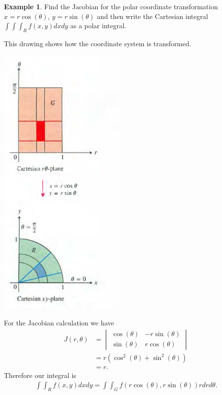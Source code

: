 \documentclass[12pt, letter]{article}
\theoremstyle{plain}
\numberwithin{theorem}{section}
\theoremstyle{definition}
\newtheorem{example}[theorem]{Example}
\begin{document}
\begin{example}
Find the Jacobian for the polar coordinate transformation $x=r\cos(\theta)$, $y=r\sin(\theta)$ and then write the Cartesian integral $\int\int\int_R f(x,y)dxdy$ as a polar integral.

\bigskip

This drawing shows how the coordinate system is transformed.

\bigskip

\begin{center}
\includegraphics[scale=0.7]{m3_f24}
\end{center}

\bigskip

For the Jacobian calculation we have
\begin{align*}
J(r,\theta) &= \begin{vmatrix} \cos(\theta) & -r\sin(\theta) \\ \sin(\theta) & r\cos(\theta) \end{vmatrix}\\
&=r(\cos^2(\theta)+\sin^2(\theta))\\
&=r.
\end{align*}
Therefore our integral is
\begin{align*}
\int\int_R f(x,y)dxdy = \int\int_G f(r\cos(\theta),r\sin(\theta)) r dr d\theta.
\end{align*}

\end{example}
\end{document}
